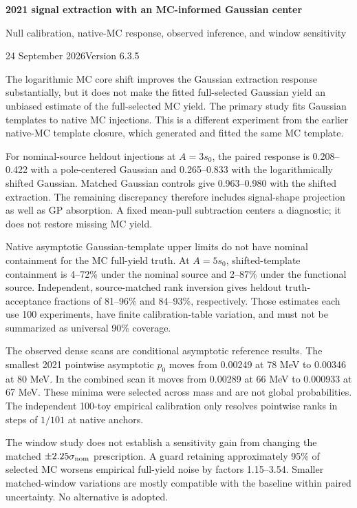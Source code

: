 \documentclass[10pt]{article}
\begin{document}
{\Large\bfseries 2021 signal extraction with an MC-informed Gaussian center}\par
{\large Null calibration, native-MC response, observed inference, and window sensitivity}\par
24 September 2026\hfill Version 6.3.5

The logarithmic MC core shift improves the Gaussian extraction response substantially, but it does not make the fitted full-selected Gaussian yield an unbiased estimate of the full-selected MC yield. The primary study fits Gaussian templates to native MC injections. This is a different experiment from the earlier native-MC template closure, which generated and fitted the same MC template.

For nominal-source heldout injections at $A=3s_0$, the paired response is 0.208--0.422 with a pole-centered Gaussian and 0.265--0.833 with the logarithmically shifted Gaussian. Matched Gaussian controls give 0.963--0.980 with the shifted extraction. The remaining discrepancy therefore includes signal-shape projection as well as GP absorption. A fixed mean-pull subtraction centers a diagnostic; it does not restore missing MC yield.

Native asymptotic Gaussian-template upper limits do not have nominal containment for the MC full-yield truth. At $A=5s_0$, shifted-template containment is 4--72\% under the nominal source and 2--87\% under the functional source. Independent, source-matched rank inversion gives heldout truth-acceptance fractions of 81--96\% and 84--93\%, respectively. Those estimates each use 100 experiments, have finite calibration-table variation, and must not be summarized as universal 90\% coverage.

The observed dense scans are conditional asymptotic reference results. The smallest 2021 pointwise asymptotic $p_0$ moves from 0.00249 at 78 MeV to 0.00346 at 80 MeV. In the combined scan it moves from 0.00289 at 66 MeV to 0.000933 at 67 MeV. These minima were selected across mass and are not global probabilities. The independent 100-toy empirical calibration only resolves pointwise ranks in steps of $1/101$ at native anchors.

The window study does not establish a sensitivity gain from changing the matched $\pm2.25\sigma_{\rm nom}$ prescription. A guard retaining approximately 95\% of selected MC worsens empirical full-yield noise by factors 1.15--3.54. Smaller matched-window variations are mostly compatible with the baseline within paired uncertainty. No alternative is adopted.
\end{document}

